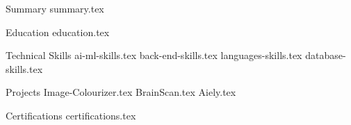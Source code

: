 \documentclass{cv_template}
\begin{document}
\begin{fitpage}

\makecvheader

\begin{cvsection}{Summary}
    {summary.tex}
\end{cvsection}

\begin{cvsection}{Education}
    {education.tex}
\end{cvsection}

\begin{cvsection}{Technical Skills}
    {ai-ml-skills.tex}
    {back-end-skills.tex}
    {languages-skills.tex}
    {database-skills.tex}
\end{cvsection}

\begin{cvsection}{Projects}
    {Image-Colourizer.tex}
    {BrainScan.tex}
    {Aiely.tex}
\end{cvsection}


\begin{cvsection}{Certifications}
    {certifications.tex}
\end{cvsection}

\end{fitpage}
\end{document}
